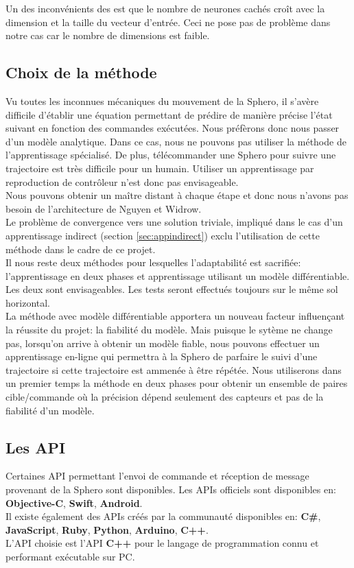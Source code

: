 \documentclass[12pt,a4paper,oneside, titlepage]{article}
\begin{document}
Un des inconvénients des \rbf est que le nombre de neurones cachés croît avec la dimension et la taille du vecteur d'entrée.
Ceci ne pose pas de problème dans notre cas car le nombre de dimensions est faible.

\subsection{Choix de la méthode}
Vu toutes les inconnues mécaniques du mouvement de la Sphero, il s'avère difficile d'établir une équation permettant de prédire de manière précise l'état suivant en fonction des commandes exécutées.
Nous préfèrons donc nous passer d'un modèle analytique.
Dans ce cas, nous ne pouvons pas utiliser la méthode de l'apprentissage spécialisé.
De plus, télécommander une Sphero pour suivre une trajectoire est très difficile pour un humain.
Utiliser un apprentissage par reproduction de contrôleur n'est donc pas envisageable.\\
Nous pouvons obtenir un maître distant à chaque étape et donc nous n'avons pas besoin de l'architecture de Nguyen et Widrow.\\
Le problème de convergence vers une solution triviale, impliqué dans le cas d'un apprentissage indirect (section \ref{sec:appindirect}) exclu l'utilisation de cette méthode dans le cadre de ce projet.\\

Il nous reste deux méthodes pour lesquelles l'adaptabilité est sacrifiée: l'apprentissage en deux phases et apprentissage utilisant un modèle différentiable.
Les deux sont envisageables. Les tests seront effectués toujours sur le même sol horizontal.\\

La méthode avec modèle différentiable apportera un nouveau facteur influençant la réussite du projet: la fiabilité du modèle.
Mais puisque le sytème ne change pas, lorsqu'on arrive à obtenir un modèle fiable, nous pouvons effectuer un apprentissage en-ligne qui permettra à la Sphero de parfaire le suivi d'une trajectoire si cette trajectoire est ammenée à être répétée.
Nous utiliserons dans un premier temps la méthode en deux phases pour obtenir un ensemble de paires cible/commande où la précision dépend seulement des capteurs et pas de la fiabilité d'un modèle.

\subsection{Les API}
Certaines API permettant l'envoi de commande et réception de message provenant de la Sphero sont disponibles.
Les APIs officiels sont disponibles en: \textbf{Objective-C}, \textbf{Swift}, \textbf{Android}\cite{SDKofficiels}.\\
Il existe également des APIs créés par la communauté disponibles en\cite{gosphero}: \textbf{C\#}, \textbf{JavaScript}, \textbf{Ruby}, \textbf{Python}\cite{pythonAPI}, \textbf{Arduino}, \textbf{C++}\cite{cppAPI}.\\
L'API choisie est l'API \textbf{C++} pour le langage de programmation connu et performant exécutable sur PC.
\end{document}
